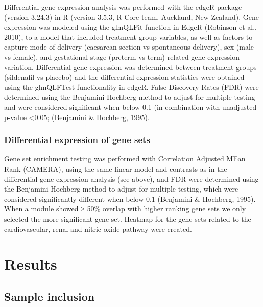 \documentclass[authordate, empirical,issue]{jote-new-article}
\begin{document}
Differential gene expression analysis was performed with the edgeR package (version 3.24.3) in R (version 3.5.3, R Core team, Auckland, New Zealand). Gene expression was modeled using the glmQLFit function in EdgeR (Robinson et al., 2010), to a model that included treatment group variables, as well as factors to capture mode of delivery (caesarean section vs spontaneous delivery), sex (male vs female), and gestational stage (preterm vs term) related gene expression variation. Differential gene expression was determined between treatment groups (sildenafil vs placebo) and the differential expression statistics were obtained using the glmQLFTest functionality in edgeR. False Discovery Rates (FDR) were determined using the Benjamini-Hochberg method to adjust for multiple testing and were considered significant when below 0.1 (in combination with unadjusted p-value <0.05; (Benjamini \& Hochberg, 1995).







\subsubsection{Differential expression of gene sets}



Gene set enrichment testing was performed with Correlation Adjusted MEan Rank (CAMERA), using the same linear model and contrasts as in the differential gene expression analysis (see above), and FDR were determined using the Benjamini-Hochberg method to adjust for multiple testing, which were considered significantly different when below 0.1 (Benjamini \& Hochberg, 1995). When a module showed ≥ 50\% overlap with higher ranking gene sets we only selected the more significant gene set. Heatmap for the gene sets related to the cardiovascular, renal and nitric oxide pathway were created.







\section{Results}







\subsection{Sample inclusion}
\end{document}
